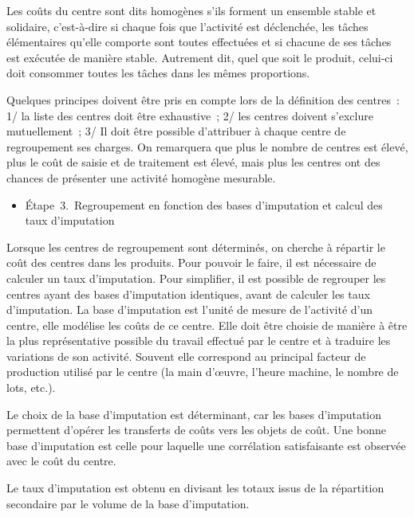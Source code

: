 \documentclass[oneside]{kaobook}
\begin{document}
Les coûts du centre sont dits homogènes s'ils forment un ensemble stable et solidaire, c'est-à-dire si chaque fois que l'activité est déclenchée, les tâches élémentaires qu'elle comporte sont toutes effectuées et si chacune de ses tâches est exécutée de manière stable. Autrement dit, quel que soit le produit, celui-ci doit consommer toutes les tâches dans les mêmes proportions.

Quelques principes doivent être pris en compte lors de la définition des centres : 1/ la liste des centres doit être exhaustive ; 2/ les centres doivent s'exclure mutuellement ; 3/ Il doit être possible d'attribuer à chaque centre de regroupement ses charges. On remarquera que plus le nombre de centres est élevé, plus le coût de saisie et de traitement est élevé, mais plus les centres ont des chances de présenter une activité homogène mesurable.

\begin{itemize}
\item Étape 3. Regroupement en fonction des bases d’imputation et calcul des taux d’imputation
\end{itemize}

Lorsque les centres de regroupement sont déterminés, on cherche à répartir le coût des centres dans les produits. Pour pouvoir le faire, il est nécessaire de calculer un taux d'imputation. Pour simplifier, il est possible de regrouper les centres ayant des bases d'imputation identiques, avant de calculer les taux d'imputation.
La base d'imputation est l'unité de mesure de l'activité d'un centre, elle modélise les coûts de ce centre. Elle doit être choisie de manière à être la plus représentative possible du travail effectué par le centre et à traduire les variations de son activité. Souvent elle correspond au principal facteur de production utilisé par le centre (la main d'œuvre, l'heure machine, le nombre de lots, etc.).

Le choix de la base d'imputation est déterminant, car les bases d'imputation permettent d'opérer les transferts de coûts vers les objets de coût. Une bonne base d'imputation est celle pour laquelle une corrélation satisfaisante est observée avec le coût du centre.

Le taux d'imputation est obtenu en divisant les totaux issus de la répartition secondaire par le volume de la base d'imputation.
\end{document}
